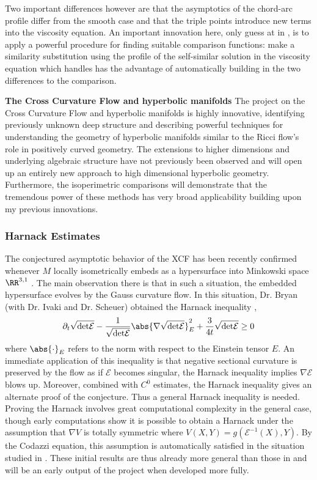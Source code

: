 \documentclass[12pt]{amsart}
\begin{document}
Two important differences however are that the asymptotics of the chord-arc profile differ from the smooth case and that the triple points introduce new terms into the viscosity equation. An important innovation here, only guess at in \cite{MR2794630}, is to apply a powerful procedure for finding suitable comparison functions: make a similarity substitution using the profile of the self-similar solution in the viscosity equation which handles has the advantage of automatically building in the two differences to the comparison.

\noindent\textbf{The Cross Curvature Flow and hyperbolic manifolds}
\label{sec:orgheadline12}
The project on the Cross Curvature Flow and hyperbolic manifolds is highly innovative, identifying previously unknown deep structure and describing powerful techniques for understanding the geometry of hyperbolic manifolds similar to the Ricci flow's role in positively curved geometry. The extensions to higher dimensions and underlying algebraic structure have not previously been observed and will open up an entirely new approach to high dimensional hyperbolic geometry. Furthermore, the isoperimetric comparisons will demonstrate that the tremendous power of these methods has very broad applicability building upon my previous innovations.

\subsubsection*{Harnack Estimates}
\label{sec:orgheadline9}
The conjectured asymptotic behavior of the XCF has been recently confirmed whenever \(M\) locally isometrically embeds as a hypersurface into Minkowski space \(\RR^{3,1}\) \cite{MR3344442}. The main observation there is that in such a situation, the embedded hypersurface evolves by the Gauss curvature flow. In this situation, Dr. Bryan (with Dr. Ivaki and Dr. Scheuer) obtained the Harnack inequality \cite{BIS4},
\[
\partial_t \sqrt{{\det} \mathcal{E}} - \frac{1}{\sqrt{{\det}\mathcal{E}}} \abs{\nabla \sqrt{{\det}\mathcal{E}}}_E^2  + \frac{3}{4 t} \sqrt{{\det}\mathcal{E}} \geq 0
\]
where \(\abs{\cdot}_E\) refers to the norm with respect to the Einstein tensor \(E\). An immediate application of this inequality is that negative sectional curvature is preserved by the flow as if \(\mathcal{E}\) becomes singular, the Harnack inequality implies \(\nabla \mathcal{E}\) blows up. Moreover, combined with \(C^0\) estimates, the Harnack inequality gives an alternate proof of the conjecture. Thus a general Harnack inequality is needed. Proving the Harnack involves great computational complexity in the general case, though early computations show it is possible to obtain a Harnack under the assumption that \(\nabla V\) is totally symmetric where \(V (X, Y) = g(\mathcal{E}^{-1}(X), Y)\). By the Codazzi equation, this assumption is automatically satisfied in the situation studied in \cite{MR3344442}. These initial results are thus already more general than those in \cite{MR3344442} and will be an early output of the project when developed more fully.
\end{document}
